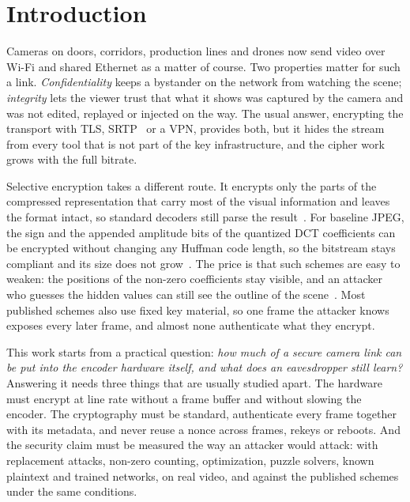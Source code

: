 \section{Introduction}\label{sec:intro}
Cameras on doors, corridors, production lines and drones now send video over Wi-Fi and shared Ethernet as a matter of course. Two properties matter for such a link. \emph{Confidentiality} keeps a bystander on the network from watching the scene; \emph{integrity} lets the viewer trust that what it shows was captured by the camera and was not edited, replayed or injected on the way. The usual answer, encrypting the transport with TLS, SRTP~\cite{rfc3711} or a VPN, provides both, but it hides the stream from every tool that is not part of the key infrastructure, and the cipher work grows with the full bitrate.

Selective encryption takes a different route. It encrypts only the parts of the compressed representation that carry most of the visual information and leaves the format intact, so standard decoders still parse the result~\cite{massoudi2008}. For baseline JPEG, the sign and the appended amplitude bits of the quantized DCT coefficients can be encrypted without changing any Huffman code length, so the bitstream stays compliant and its size does not grow~\cite{vandroogenbroeck2002,auer2013}. The price is that such schemes are easy to weaken: the positions of the non-zero coefficients stay visible, and an attacker who guesses the hidden values can still see the outline of the scene~\cite{massoudi2008,lin2024,hirose2024}. Most published schemes also use fixed key material, so one frame the attacker knows exposes every later frame, and almost none authenticate what they encrypt.

This work starts from a practical question: \emph{how much of a secure camera link can be put into the encoder hardware itself, and what does an eavesdropper still learn?} Answering it needs three things that are usually studied apart. The hardware must encrypt at line rate without a frame buffer and without slowing the encoder. The cryptography must be standard, authenticate every frame together with its metadata, and never reuse a nonce across frames, rekeys or reboots. And the security claim must be measured the way an attacker would attack: with replacement attacks, non-zero counting, optimization, puzzle solvers, known plaintext and trained networks, on real video, and against the published schemes under the same conditions.


